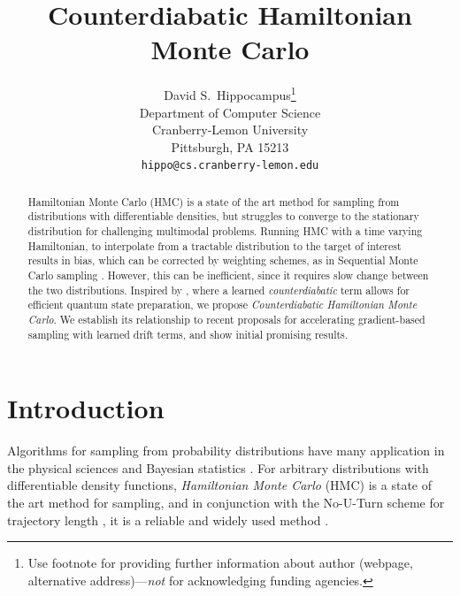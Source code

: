 \documentclass{article}
\title{Counterdiabatic Hamiltonian Monte Carlo}
\author{%
  David S.~Hippocampus\thanks{Use footnote for providing further information
    about author (webpage, alternative address)---\emph{not} for acknowledging
    funding agencies.} \\
  Department of Computer Science\\
  Cranberry-Lemon University\\
  Pittsburgh, PA 15213 \\
  \texttt{hippo@cs.cranberry-lemon.edu} \\
}
\begin{document}
\maketitle


\begin{abstract}
  Hamiltonian Monte Carlo (HMC) is a state of the art method for sampling from distributions with differentiable densities, but struggles to converge to the stationary distribution for challenging multimodal problems. Running HMC with a time varying Hamiltonian, to interpolate from a tractable distribution to the target of interest results in bias, which can be corrected by weighting schemes, as in Sequential Monte Carlo sampling \cite{doucet2001introduction}. However, this can be inefficient, since it requires slow change between the two distributions. Inspired by \cite{sels2017minimizing}, where a learned \emph{counterdiabatic} term allows for efficient quantum state preparation, we propose \emph{Counterdiabatic Hamiltonian Monte Carlo}. We establish its relationship to recent proposals for accelerating gradient-based sampling with learned drift terms, and show initial promising results.
\end{abstract}

\section{Introduction}

Algorithms for sampling from probability distributions have many application in the physical sciences \cite{tuckerman2023statistical, von2011bayesian} and Bayesian statistics \cite{gamerman2006markov}. For arbitrary distributions with differentiable density functions, \emph{Hamiltonian Monte Carlo} (HMC) \cite{betancourt2017conceptual} is a state of the art method for sampling, and in conjunction with the No-U-Turn scheme for trajectory length \cite{hoffman2014no}, it is a reliable and widely used method \cite{gelman2015stan}.

\end{document}

